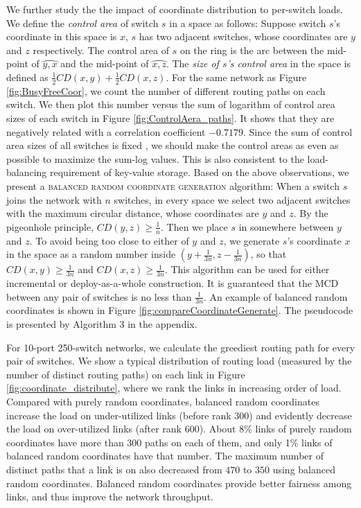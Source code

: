 \documentclass[10pt,conference]{IEEEtran}
\begin{document}
We further study the the impact of coordinate distribution to per-switch loads.
We define the \emph{control area} of switch $s$ in a space as follows:
Suppose switch $s$'s coordinate in this space is $x$, $s$ has two adjacent switches, whose coordinates are $y$ and $z$ respectively.
The control area of $s$ on the ring is the arc between the mid-point of $ \wideparen{y,x} $ and the mid-point of $\wideparen{x,z}$.
The \emph{size of $s$'s control area} in the space is defined as $\frac{1}{2}CD(x,y)+\frac{1}{2}CD(x,z)$.
For the same network as Figure \ref{fig:BusyFreeCoor}, we count the number of different routing paths on each switch.
We then plot this number versus the  sum of logarithm of control area sizes of each switch in Figure \ref{fig:ControlAera_paths}.
It shows that they are negatively related with a correlation coefficient $-0.7179$. Since the sum of control area sizes of all switches is fixed , we should make the control areas as even as possible to maximize the sum-log values. This is also consistent to the load-balancing requirement of key-value storage.
Based on the above observations, we present a \textsc{balanced random coordinate generation} algorithm: When a switch $s$ joins the network with $n$ switches, in every space we select two adjacent switches with the maximum circular distance, whose coordinates are $y$ and $z$.
By the pigeonhole principle, $CD(y, z) \geq \frac{1}{n}$.
Then we place $s$ in somewhere between $y$ and $z$.
To avoid being too close to either of $y$ and $z$, we generate $s$'s coordinate $x$ in the space as a random number inside $(y+\frac{1}{3n}, z-\frac{1}{3n})$, so that $CD(x,y) \geq \frac{1}{3n}$ and $CD(x,z) \geq \frac{1}{3n}$.
This algorithm can be used for either incremental or deploy-as-a-whole construction. It is guaranteed that the MCD between any pair of switches is no less than $\frac{1}{3n}$. An example of balanced random coordinates is shown in Figure \ref{fig:compareCoordinateGenerate}. The pseudocode is presented by Algorithm 3 in the appendix. 


For 10-port 250-switch networks, we calculate the greediest routing path for every pair of switches. We show a typical distribution of routing load (measured by the number of distinct routing paths) on each link in Figure \ref{fig:coordinate_distribute}, where we rank the links in increasing order of load. Compared with purely random coordinates, balanced random coordinates increase the load on under-utilized links (before rank 300) and evidently decrease the load on over-utilized links (after rank 600). About 8\% links of  purely random coordinates have more than 300 paths on each of them, and only 1\%  links of balanced random coordinates have that number. The maximum number of distinct paths that a link is on also decreased from $470 $ to $350$ using balanced random coordinates. Balanced random coordinates provide better fairness among links, and thus improve the network throughput.
\end{document}
